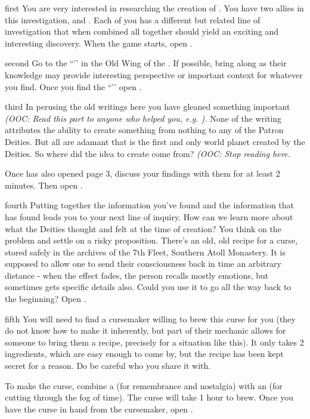 \documentclass[greennotebook]{GL2020} %
\begin{document}
\startnotebook{\nCreationOne{}}

\begin{page}{first}
You are very interested in researching the creation of \pEarth{}. You have two allies in this investigation, \cHeadScientist{\full} and \cScholarship{\full}. Each of you has a different but related line of investigation that when combined all together should yield an exciting and interesting discovery. When the game starts, open .
\end{page}

\begin{page}{second}
Go to the ``\sOldPhilosophyOne{}’’ in the Old Wing of the \pSc{}. If possible, bring \cPrincipal{} along as their knowledge may provide interesting perspective or important context for whatever you find. Once you find the ``\sOldPhilosophyOne{}’’ open .
\end{page}

\begin{page}{third}
In perusing the old writings here you have gleaned something important \emph{(OOC: Read this part to anyone who helped you, e.g. \cPrincipal{}).} None of the writing attributes the ability to create something from nothing to any of the Patron Deities. But all are adamant that \pEarth{} is the first and only world planet created by the Deities. So where did the idea to create\pEarth{} come from? \emph{(OOC: Stop reading here.}

Once \textbf{\cHeadScientist{}} has also opened page 3, discuss your findings with them for at least 2 minutes. Then open .
\end{page}

\begin{page}{fourth}
Putting together the information you’ve found and the information that \cHeadScientist{} has found leads you to your next line of inquiry. How can we learn more about what the Deities thought and felt at the time of creation? You think on the problem and settle on a risky proposition. There’s an old, old recipe for a curse, stored safely in the archives of the 7th Fleet, Southern Atoll Monastery. It is supposed to allow one to send their consciousness back in time an arbitrary distance - when the effect fades, the person recalls mostly emotions, but sometimes gets specific details also. Could you use it to go all the way back to the beginning? Open .
\end{page}

\begin{page}{fifth}
You will need to find a cursemaker willing to brew this curse for you (they do not know how to make it inherently, but part of their mechanic allows for someone to bring them a recipe, precisely for a situation like this). It only takes 2 ingredients, which are easy enough to come by, but the recipe has been kept secret for a reason. Do be careful who you share it with.

To make the curse, combine a \iHollyhock{} (for remembrance and nostalgia) with an \iObsidian{} (for cutting through the fog of time). The curse will take 1 hour to brew. Once you have the curse in hand from the cursemaker, open .
\end{page}
\end{document}
